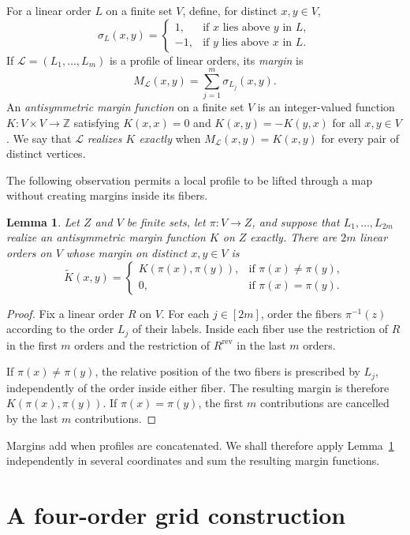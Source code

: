 \documentclass[12pt]{article}
\newtheorem{lemma}[theorem]{Lemma}
\theoremstyle{remark}
\newcommand{\rev}{\mathrm{rev}}
\newcommand{\cL}{\mathcal{L}}
\newcommand{\margin}{M}
\begin{document}
For a linear order $L$ on a finite set $V$, define, for distinct
$x,y\in V$,
\[
  \sigma_L(x,y)=
  \begin{cases}
    1,&\text{if $x$ lies above $y$ in $L$},\\
   -1,&\text{if $y$ lies above $x$ in $L$}.
  \end{cases}
\]
If $\cL=(L_1,\ldots,L_m)$ is a profile of linear orders, its
\emph{margin} is
\[
  \margin_{\cL}(x,y)=\sum_{j=1}^m \sigma_{L_j}(x,y).
\]
An \emph{antisymmetric margin function} on a finite set $V$ is an
integer-valued function $K:V\times V\to\mathbb Z$ satisfying
$K(x,x)=0$ and $K(x,y)=-K(y,x)$ for all $x,y\in V$.  We say that
$\cL$ \emph{realizes $K$ exactly} when $\margin_{\cL}(x,y)=K(x,y)$
for every pair of distinct vertices.

The following observation permits a local profile to be lifted through
a map without creating margins inside its fibers.

\begin{lemma}\label{lem:lifting}
Let $Z$ and $V$ be finite sets, let $\pi:V\to Z$, and suppose that
$L_1,\ldots,L_{2m}$ realize an antisymmetric margin function $K$ on
$Z$ exactly.  There are $2m$ linear orders on $V$ whose margin on
distinct $x,y\in V$ is
\[
  \widetilde K(x,y)=
  \begin{cases}
    K(\pi(x),\pi(y)),&\text{if $\pi(x)\ne\pi(y)$},\\
    0,&\text{if $\pi(x)=\pi(y)$}.
  \end{cases}
\]
\end{lemma}

\begin{proof}
Fix a linear order $R$ on $V$.  For each $j\in[2m]$, order the fibers
$\pi^{-1}(z)$ according to the order $L_j$ of their labels.  Inside
each fiber use the restriction of $R$ in the first $m$ orders and the
restriction of $R^{\rev}$ in the last $m$ orders.

If $\pi(x)\ne\pi(y)$, the relative position of the two fibers is
prescribed by $L_j$, independently of the order inside either fiber.
The resulting margin is therefore $K(\pi(x),\pi(y))$.  If
$\pi(x)=\pi(y)$, the first $m$ contributions are cancelled by the last
$m$ contributions.
\end{proof}

Margins add when profiles are concatenated.  We shall therefore apply
Lemma~\ref{lem:lifting} independently in several coordinates and sum
the resulting margin functions.

\section{A four-order grid construction}
\end{document}
